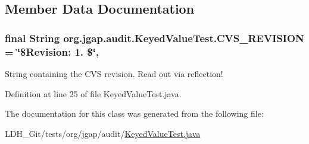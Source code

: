 \subsection{Member Data Documentation}
\hypertarget{classorg_1_1jgap_1_1audit_1_1_keyed_value_test_a17414fa519ccb19da562b5bb3bfd9e09}{
\subsubsection[{C\-V\-S\-\_\-\-R\-E\-V\-I\-S\-I\-O\-N}]{\setlength{\rightskip}{0pt plus 5cm}final String org.\-jgap.\-audit.\-Keyed\-Value\-Test.\-C\-V\-S\-\_\-\-R\-E\-V\-I\-S\-I\-O\-N = \char`\"{}\$Revision\-: 1. \$\char`\"{}\hspace{0.3cm}{\ttfamily [static]}, {\ttfamily [private]}}}\label{classorg_1_1jgap_1_1audit_1_1_keyed_value_test_a17414fa519ccb19da562b5bb3bfd9e09}
String containing the C\-V\-S revision. Read out via reflection! 

Definition at line 25 of file Keyed\-Value\-Test.\-java.



The documentation for this class was generated from the following file\-:\begin{DoxyCompactItemize}
\item 
L\-D\-H\-\_\-\-Git/tests/org/jgap/audit/\hyperlink{_keyed_value_test_8java}{Keyed\-Value\-Test.\-java}\end{DoxyCompactItemize}
